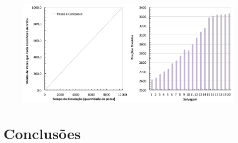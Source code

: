 \documentclass[11pt,a4paper]{article}
\begin{document}
\begin{figure}[htbp]
  \label{fig:pc}
  \begin{center}
    \includegraphics[scale=0.5]{pesos_complexo.pdf}
    \caption{}
  \end{center}
\end{figure}


\section{Conclusões}
\label{sec:conc}


\end{document}
